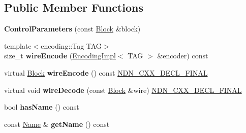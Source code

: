 \subsection*{Public Member Functions}
\begin{DoxyCompactItemize}
\item 
{\bfseries Control\+Parameters} (const \hyperlink{classndn_1_1Block}{Block} \&block)\hypertarget{classndn_1_1nfd_1_1ControlParameters_a80a845ad3454a79ec3d29f4f442e6b27}{}\label{classndn_1_1nfd_1_1ControlParameters_a80a845ad3454a79ec3d29f4f442e6b27}

\item 
{\footnotesize template$<$encoding\+::\+Tag T\+AG$>$ }\\size\+\_\+t {\bfseries wire\+Encode} (\hyperlink{classndn_1_1encoding_1_1EncodingImpl}{Encoding\+Impl}$<$ T\+AG $>$ \&encoder) const\hypertarget{classndn_1_1nfd_1_1ControlParameters_aa1d5020de2495da64eee3e8597836566}{}\label{classndn_1_1nfd_1_1ControlParameters_aa1d5020de2495da64eee3e8597836566}

\item 
virtual \hyperlink{classndn_1_1Block}{Block} {\bfseries wire\+Encode} () const \hyperlink{ndn-cxx_2src_2common_8hpp_ab53a383abb72682805543301b5f2c244}{N\+D\+N\+\_\+\+C\+X\+X\+\_\+\+D\+E\+C\+L\+\_\+\+F\+I\+N\+AL}\hypertarget{classndn_1_1nfd_1_1ControlParameters_aa354097cf3e8ddb5cc0fac73cdcdb507}{}\label{classndn_1_1nfd_1_1ControlParameters_aa354097cf3e8ddb5cc0fac73cdcdb507}

\item 
virtual void {\bfseries wire\+Decode} (const \hyperlink{classndn_1_1Block}{Block} \&wire) \hyperlink{ndn-cxx_2src_2common_8hpp_ab53a383abb72682805543301b5f2c244}{N\+D\+N\+\_\+\+C\+X\+X\+\_\+\+D\+E\+C\+L\+\_\+\+F\+I\+N\+AL}\hypertarget{classndn_1_1nfd_1_1ControlParameters_ab6534eae4f9ac13816675c8ee58f4d21}{}\label{classndn_1_1nfd_1_1ControlParameters_ab6534eae4f9ac13816675c8ee58f4d21}

\item 
bool {\bfseries has\+Name} () const\hypertarget{classndn_1_1nfd_1_1ControlParameters_a4597848cb0535d400ca2b116318783d7}{}\label{classndn_1_1nfd_1_1ControlParameters_a4597848cb0535d400ca2b116318783d7}

\item 
const \hyperlink{classndn_1_1Name}{Name} \& {\bfseries get\+Name} () const\hypertarget{classndn_1_1nfd_1_1ControlParameters_aba35994433e3da57d7b36d0460d6c9d8}{}\label{classndn_1_1nfd_1_1ControlParameters_aba35994433e3da57d7b36d0460d6c9d8}


\end{DoxyCompactItemize}
